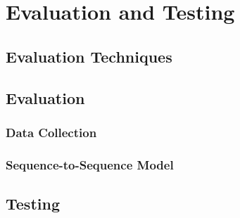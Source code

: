 \section{Evaluation and Testing}

\subsection{Evaluation Techniques}

\subsection{Evaluation}
\subsubsection{Data Collection}

\subsubsection{Sequence-to-Sequence Model}


\subsection{Testing}
